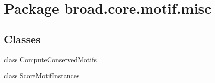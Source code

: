 \hypertarget{namespacebroad_1_1core_1_1motif_1_1misc}{\section{Package broad.\+core.\+motif.\+misc}
\label{namespacebroad_1_1core_1_1motif_1_1misc}
}
\subsection*{Classes}
\begin{DoxyCompactItemize}
\item 
class \hyperlink{classbroad_1_1core_1_1motif_1_1misc_1_1_compute_conserved_motifs}{Compute\+Conserved\+Motifs}
\item 
class \hyperlink{classbroad_1_1core_1_1motif_1_1misc_1_1_score_motif_instances}{Score\+Motif\+Instances}
\end{DoxyCompactItemize}
